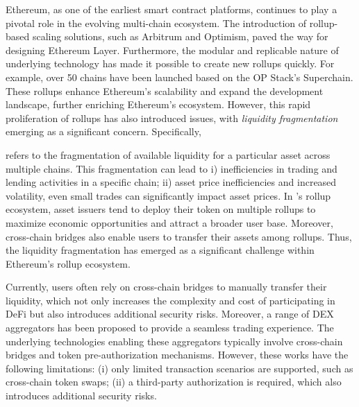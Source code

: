 Ethereum, as one of the earliest smart contract platforms, continues to play a pivotal role in the evolving multi-chain ecosystem\cite{Wood2014Ethereum}. The introduction of rollup-based scaling solutions, such as Arbitrum and Optimism, paved the way for designing Ethereum Layer\cite{kalodner2018arbitrum, donno2022optimistic, scroll,zksync}. Furthermore, the modular and replicable nature of underlying technology has made it possible to create new rollups quickly.
For example, over 50 chains have been launched based on the OP Stack's Superchain\cite{superchain}. These rollups enhance Ethereum's scalability and expand the development landscape, further enriching Ethereum's ecosystem. However, this rapid proliferation of rollups has also introduced issues, with \emph{liquidity fragmentation} emerging as a significant concern. Specifically, 

 refers to the fragmentation of available liquidity for a particular asset across multiple chains. This fragmentation can lead to i) inefficiencies in trading and lending activities in a specific chain; ii) asset price inefficiencies and increased volatility, even small trades can significantly impact asset prices\cite{lehar2023liquidity}.
In \ethereum's rollup ecosystem, asset issuers tend to deploy their token on multiple rollups to maximize economic opportunities and attract a broader user base. Moreover, cross-chain bridges also enable users to transfer their assets among rollups\cite{whinfrey2021hop, xie2022zkbridge, lan2021horizon,zetachain,chainflip,Interlay}.
Thus, the liquidity fragmentation has emerged as a significant challenge within Ethereum's rollup ecosystem.

Currently, users often rely on cross-chain bridges to manually transfer their liquidity, which not only increases the complexity and cost of participating in DeFi but also introduces additional security risks\cite{lehar2023liquidity, augusto2024sok}.
Moreover, a range of DEX aggregators\cite{1inch,swoopexchange,matcha} has been proposed to provide a seamless trading experience. The underlying technologies enabling these aggregators typically involve cross-chain bridges and token pre-authorization mechanisms. However, these works have the following limitations: (i) only limited transaction scenarios are supported, such as cross-chain token swaps; (ii) a third-party authorization is required, which also introduces additional security risks.


